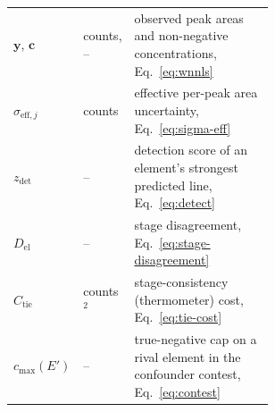 \begin{table}[h]
\begin{tabular}{@{}llp{0.58\linewidth}@{}}
$\mathbf{y}$, $\mathbf{c}$ & counts, -- & observed peak areas and non-negative concentrations, Eq.~\eqref{eq:wnnls} \\
$\sigma_{\mathrm{eff},j}$ & counts & effective per-peak area uncertainty, Eq.~\eqref{eq:sigma-eff} \\
$z_\mathrm{det}$ & -- & detection score of an element's strongest predicted line, Eq.~\eqref{eq:detect} \\
$D_\mathrm{el}$ & -- & stage disagreement, Eq.~\eqref{eq:stage-disagreement} \\
$C_\mathrm{tie}$ & counts$^2$ & stage-consistency (thermometer) cost, Eq.~\eqref{eq:tie-cost} \\
$c_\mathrm{max}(E')$ & -- & true-negative cap on a rival element in the confounder contest, Eq.~\eqref{eq:contest} \\
\bottomrule
\end{tabular}
\end{table}
